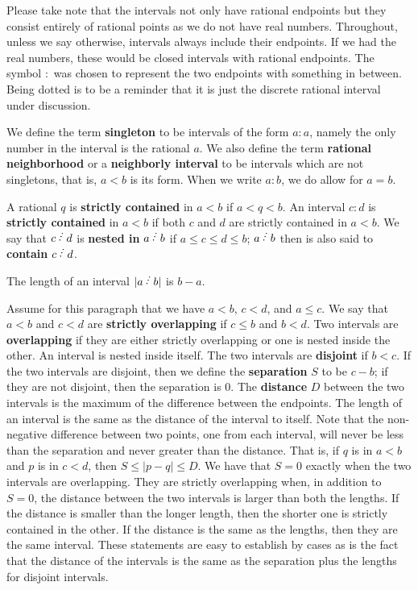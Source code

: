 \documentclass[12pt]{article}
\begin{document}
Please take note that the intervals not only have rational endpoints but they consist entirely of rational points as we do not have real numbers. Throughout, unless we say otherwise, intervals always include their endpoints. If we had the real numbers, these would be closed intervals with rational endpoints.  The symbol $:$ was chosen to represent the two endpoints with something in between. Being dotted is to be a reminder that it is just the discrete rational interval under discussion. 

We define the term \textbf{singleton} to be intervals of the form $a:a$, namely the only number in the interval is the rational $a$. We also define the term \textbf{rational neighborhood} or a \textbf{neighborly interval} to be intervals which are not singletons, that is, $a \lt b$ is its form. When we write $a:b$, we do allow for $a=b$.

A rational $q$ is \textbf{strictly contained} in $a\lt b$ if $a < q < b$. An interval $c:d$ is \textbf{strictly contained} in $a\lt b$ if both $c$ and $d$ are strictly contained in $a \lt b$. We say that $c \lte d$ is \textbf{nested in} $a\lte b$ if $a \leq c \leq d \leq b$; $a \lte b$ then is also said to \textbf{contain} $c \lte d$. 

The length of an interval $|a \lte b |$ is $b-a$. 

Assume for this paragraph that we have $a \lt b$, $c \lt d$, and $a \leq c$. We say that $a\lt b$ and $c \lt d$ are \textbf{strictly overlapping} if $c \leq b$ and $b < d$. Two intervals are \textbf{overlapping} if they are either strictly overlapping or one is nested inside the other. An interval is nested inside itself. The two intervals are \textbf{disjoint} if $b < c$. If the two intervals are disjoint, then we define the \textbf{separation} $S$ to be $c-b$; if they are not disjoint, then the separation is 0.  The \textbf{distance} $D$ between the two intervals is the maximum of the difference between the endpoints. The length of an interval is the same as the distance of the interval to itself. Note that the non-negative difference between two points, one from each interval, will never be less than the separation and never greater than the distance. That is, if $q$ is in $a\lt b$ and $p$ is in $c \lt d$, then $S \leq |p-q| \leq D$. We have that  $S = 0$ exactly when the two intervals are overlapping. They are strictly overlapping when, in addition to $S=0$,  the distance between the two intervals is larger than both the lengths. If the distance is smaller than the longer length, then the shorter one is strictly contained in the other. If the distance is the same as the lengths, then they are the same interval. These statements are easy to establish by cases as is the fact that the distance of the intervals is the same as the separation plus the lengths for disjoint intervals. 
\end{document}
